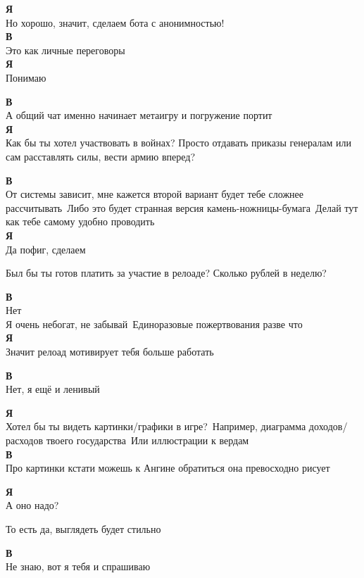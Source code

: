\textbf{Я}\\
Но хорошо, значит, сделаем бота с анонимностью!\\

\textbf{В}\\
Это как личные переговоры\\

\textbf{Я}\\
Понимаю

\textbf{В}\\
А общий чат именно начинает метаигру и погружение портит\\

\textbf{Я}\\
Как бы ты хотел участвовать в войнах? Просто отдавать приказы генералам или сам расставлять силы, вести армию вперед?

\textbf{В}\\
От системы зависит, мне кажется второй вариант будет тебе сложнее рассчитывать\
Либо это будет странная версия камень-ножницы-бумага\
Делай тут как тебе самому удобно проводить\\

\textbf{Я}\\
Да пофиг, сделаем

Был бы ты готов платить за участие в релоаде? Сколько рублей в неделю?

\textbf{В}\\
Нет\\
Я очень небогат, не забывай\
Единоразовые пожертвования разве что\\

\textbf{Я}\\
Значит релоад мотивирует тебя больше работать

\textbf{В}\\
Нет, я ещё и ленивый

\textbf{Я}\\
Хотел бы ты видеть картинки/графики в игре?\
Например, диаграмма доходов/расходов твоего государства\
Или иллюстрации к вердам\\

\textbf{В}\\
Про картинки кстати можешь к Ангине обратиться она превосходно рисует

\textbf{Я}\\
А оно надо?

То есть да, выглядеть будет стильно

\textbf{В}\\
Не знаю, вот я тебя и спрашиваю


